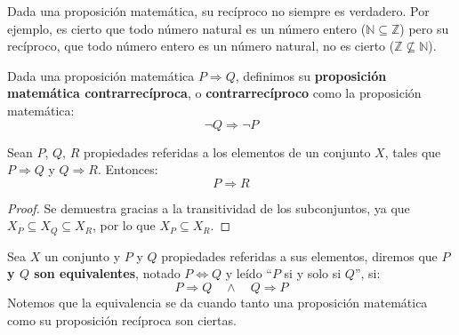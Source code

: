 \begin{observacion}
    Dada una proposición matemática, su recíproco no siempre es verdadero. Por ejemplo, es cierto que todo número natural es un número entero ($\mathbb{N} \subseteq \mathbb{Z}$) pero su recíproco, que todo número entero es un número natural, no es cierto ($\mathbb{Z} \nsubseteq \mathbb{N}$).
\end{observacion}

\begin{definicion}[Contrarrecíproco]
    Dada una proposición matemática $P\Longrightarrow Q$, definimos su \textbf{proposición matemática contrarrecíproca}, o \textbf{contrarrecíproco} como la proposición matemática:
    \begin{equation*}
        \lnot Q \Longrightarrow \lnot P
    \end{equation*}
\end{definicion}

\begin{prop}[Transitividad]
    Sean $P$, $Q$, $R$ propiedades referidas a los elementos de un conjunto $X$, tales que $P \Longrightarrow Q$
    y $Q \Longrightarrow R$. Entonces:
    $$P \Longrightarrow R$$
\end{prop}
\begin{proof}
    Se demuestra gracias a la transitividad de los subconjuntos, ya que $X_P\subseteq X_Q\subseteq X_R$, por lo que $X_P\subseteq X_R$.
\end{proof}

\begin{definicion}[Equivalencia]
    Sea $X$ un conjunto y $P$ y $Q$ propiedades referidas a sus elementos, diremos que \textbf{$P$ y $Q$ son equivalentes}, notado $P \Longleftrightarrow Q$ y leído ``$P$ si y solo si $Q$'', si:
    $$P \Longrightarrow Q \quad\land\quad Q \Longrightarrow P$$
    Notemos que la equivalencia se da cuando tanto una proposición matemática como su proposición recíproca son ciertas.
\end{definicion}

